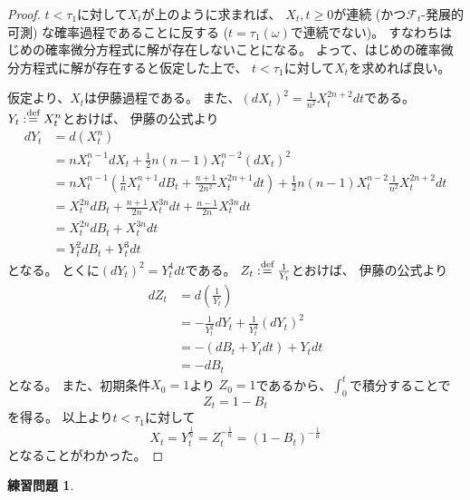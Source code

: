 \documentclass[uplatex]{jsarticle}
\theoremstyle{definition}
\newtheorem{prob}[prob]{練習問題}
\def\mcF{\mathcal{F}}
\def\dfn{:\overset{\mbox{{\scriptsize def}}}{=}}
\begin{document}
\begin{proof}
  \(t<\tau_1\)に対して\(X_t\)が上のように求まれば、
  \(X_t, t\geq 0\)が連続 (かつ\(\mcF_t\)-発展的可測) な確率過程であることに反する
  (\(t=\tau_1(\omega)\)で連続でない)。
  すなわちはじめの確率微分方程式に解が存在しないことになる。
  よって、はじめの確率微分方程式に解が存在すると仮定した上で、
  \(t<\tau_1\)に対して\(X_t\)を求めれば良い。

  仮定より、\(X_t\)は伊藤過程である。
  また、\((dX_t)^2 = \frac{1}{n^2}X_t^{2n+2}dt\)である。
  \(Y_t \dfn X_t^n\)とおけば、
  伊藤の公式より
  \begin{align*}
    dY_t
    &= d(X_t^n) \\
    &= nX_t^{n-1}dX_t + \frac{1}{2}n(n-1)X_t^{n-2}(dX_t)^2 \\
    &= nX_t^{n-1}\left( \frac{1}{n}X_t^{n+1}dB_t
    + \frac{n+1}{2n^2}X_t^{2n+1}dt\right)
    + \frac{1}{2}n(n-1)X_t^{n-2}\frac{1}{n^2}X_t^{2n+2}dt \\
    &= X_t^{2n}dB_t
    + \frac{n+1}{2n}X_t^{3n}dt
    + \frac{n-1}{2n}X_t^{3n}dt \\
    &= X_t^{2n}dB_t + X_t^{3n}dt \\
    &= Y_t^2dB_t + Y_t^3dt
  \end{align*}
  となる。
  とくに\((dY_t)^2 = Y_t^4dt\)である。
  \(Z_t \dfn \frac{1}{Y_t}\)とおけば、
  伊藤の公式より
  \begin{align*}
    dZ_t
    &= d\left( \frac{1}{Y_t}\right) \\
    &= -\frac{1}{Y_t^2}dY_t + \frac{1}{Y_t^3}(dY_t)^2 \\
    &= -(dB_t+Y_tdt) + Y_tdt \\
    &= -dB_t
  \end{align*}
  となる。
  また、初期条件\(X_0=1\)より
  \(Z_0 = 1\)であるから、\(\int_0^t\)で積分することで
  \[
  Z_t = 1-B_t
  \]
  を得る。
  以上より\(t < \tau_1\)に対して
  \[
  X_t = Y_t^{\frac{1}{n}} = Z_t^{-\frac{1}{n}} = (1-B_t)^{-\frac{1}{n}}
  \]
  となることがわかった。
\end{proof}


















\begin{prob}\label{prob: 5.3}

\end{prob}
\end{document}
